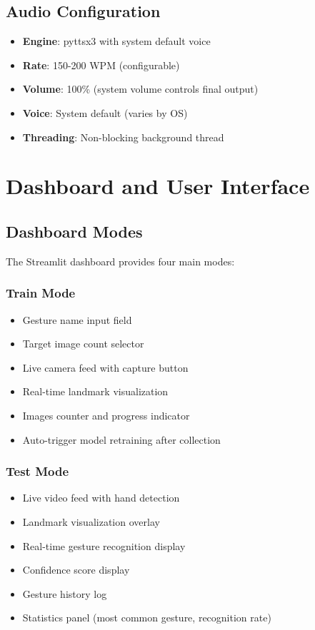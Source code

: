 \subsection{Audio Configuration}

\begin{itemize}
    \item \textbf{Engine}: pyttsx3 with system default voice
    \item \textbf{Rate}: 150-200 WPM (configurable)
    \item \textbf{Volume}: 100\% (system volume controls final output)
    \item \textbf{Voice}: System default (varies by OS)
    \item \textbf{Threading}: Non-blocking background thread
\end{itemize}

\section{Dashboard and User Interface}

\subsection{Dashboard Modes}

The Streamlit dashboard provides four main modes:

\subsubsection{Train Mode}
\begin{itemize}
    \item Gesture name input field
    \item Target image count selector
    \item Live camera feed with capture button
    \item Real-time landmark visualization
    \item Images counter and progress indicator
    \item Auto-trigger model retraining after collection
\end{itemize}

\subsubsection{Test Mode}
\begin{itemize}
    \item Live video feed with hand detection
    \item Landmark visualization overlay
    \item Real-time gesture recognition display
    \item Confidence score display
    \item Gesture history log
    \item Statistics panel (most common gesture, recognition rate)
\end{itemize}

